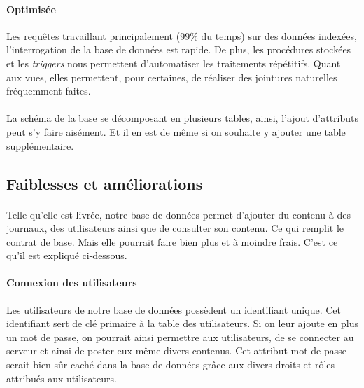\paragraph{Optimis\'{e}e}{
    Les requêtes travaillant principalement (99\% du temps) sur des donn\'{e}es index\'{e}es, l'interrogation de la base de donn\'{e}es est rapide. De plus, les proc\'{e}dures stock\'{e}es et les \textit{triggers} nous permettent d'automatiser les traitements r\'{e}p\'{e}titifs. Quant aux vues, elles permettent, pour certaines, de r\'{e}aliser des jointures naturelles fréquemment faites.
}

\paragraph{}{
    La sch\'{e}ma de la base se d\'{e}composant en plusieurs tables, ainsi, l'ajout d'attributs peut s'y faire ais\'{e}ment. Et il en est de même si on souhaite y ajouter une table suppl\'{e}mentaire. 
}

\subsection{Faiblesses et am\'{e}liorations}

\paragraph{}{
    Telle qu'elle est livr\'{e}e, notre base de donn\'{e}es permet d'ajouter du contenu \`{a} des journaux, des utilisateurs ainsi que de consulter son contenu. Ce qui remplit le contrat de base. Mais elle pourrait faire bien plus et \`{a} moindre frais. C'est ce qu'il est expliqu\'{e} ci-dessous.
}

\paragraph{Connexion des utilisateurs}{
    Les utilisateurs de notre base de donn\'{e}es poss\`{e}dent un identifiant unique. Cet identifiant sert de cl\'{e} primaire \`{a} la table des utilisateurs. Si on leur ajoute en plus un mot de passe, on pourrait ainsi permettre aux utilisateurs, de se connecter au serveur et ainsi de poster eux-m\^{e}me divers contenus. Cet attribut mot de passe serait bien-sûr cach\'{e} dans la base de donn\'{e}es grâce aux divers droits et r\^{o}les attribués aux utilisateurs.
}

